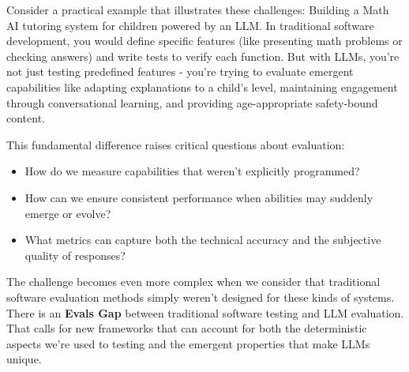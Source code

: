 Consider a practical example that illustrates these challenges: Building a Math AI tutoring system for children powered by an LLM. In traditional software development, you would define specific features (like presenting math problems or checking answers) and write tests to verify each function. But with LLMs, you're not just testing predefined features - you're trying to evaluate emergent capabilities like adapting explanations to a child's level, maintaining engagement through conversational learning, and providing age-appropriate safety-bound content.

This fundamental difference raises critical questions about evaluation:
\begin{itemize}
    \item How do we measure capabilities that weren't explicitly programmed?
    \item How can we ensure consistent performance when abilities may suddenly emerge or evolve?
    \item What metrics can capture both the technical accuracy and the subjective quality of responses?
\end{itemize}

The challenge becomes even more complex when we consider that traditional software  evaluation methods simply weren't designed for these kinds of systems. There is an \textbf{Evals Gap} between traditional software testing and LLM evaluation. That calls for new frameworks that can account for both the deterministic aspects we're used to testing and the emergent properties that make LLMs unique. 

